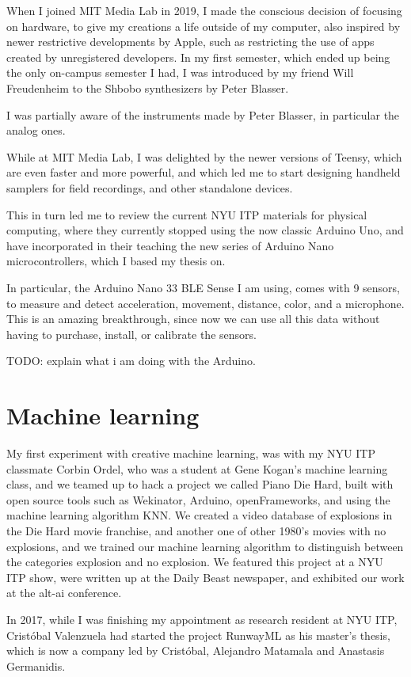 When I joined MIT Media Lab in 2019, I made the conscious decision of focusing on hardware, to give my creations a life outside of my computer, also inspired by newer restrictive developments by Apple, such as restricting the use of apps created by unregistered developers. In my first semester, which ended up being the only on-campus semester I had, I was introduced by my friend Will Freudenheim to the Shbobo synthesizers by Peter Blasser.

I was partially aware of the instruments made by Peter Blasser, in particular the analog ones.

While at MIT Media Lab, I was delighted by the newer versions of Teensy, which are even faster and more powerful, and which led me to start designing handheld samplers for field recordings, and other standalone devices.

This in turn led me to review the current NYU ITP materials for physical computing, where they currently stopped using the now classic Arduino Uno, and have incorporated in their teaching the new series of Arduino Nano microcontrollers, which I based my thesis on.

In particular, the Arduino Nano 33 BLE Sense I am using, comes with 9 sensors, to measure and detect acceleration, movement, distance, color, and a microphone. This is an amazing breakthrough, since now we can use all this data without having to purchase, install, or calibrate the sensors.

TODO: explain what i am doing with the Arduino.

\section{Machine learning}

My first experiment with creative machine learning, was with my NYU ITP classmate Corbin Ordel, who was a student at Gene Kogan's machine learning class, and we teamed up to hack a project we called Piano Die Hard, built with open source tools such as Wekinator, Arduino, openFrameworks, and using the machine learning algorithm KNN. We created a video database of explosions in the Die Hard movie franchise, and another one of other 1980's movies with no explosions, and we trained our machine learning algorithm to distinguish between the categories explosion and no explosion. We featured this project at a NYU ITP show, were written up at the Daily Beast newspaper, and exhibited our work at the alt-ai conference.

In 2017, while I was finishing my appointment as research resident at NYU ITP, Cristóbal Valenzuela had started the project RunwayML as his master's thesis, which is now a company led by Cristóbal, Alejandro Matamala and Anastasis Germanidis.

